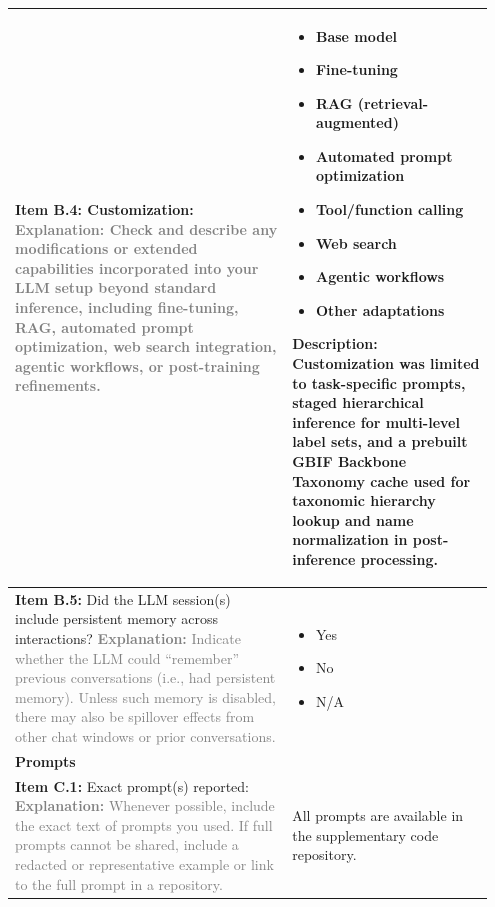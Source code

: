 \documentclass[12pt]{article}
\newcommand{\checked}{\ding{110}}
\newcommand{\unchecked}{\ding{111}}
\begin{document}
\begin{landscape}
{\begin{longtable}{|p{0.55\linewidth}|p{0.40\linewidth}|}
\textbf{Item B.4:} Customization: \textcolor{gray}{{\footnotesize \textbf{Explanation:} Check and describe any modifications or extended capabilities incorporated into your LLM setup beyond standard inference, including fine-tuning, RAG, automated prompt optimization, web search integration, agentic workflows, or post-training refinements.}} & \begin{itemize}[leftmargin=*]\setlength{\itemsep}{0pt}\setlength{\parskip}{0pt} \item[\checked] Base model \item[\unchecked] Fine-tuning \item[\unchecked] RAG (retrieval-augmented) \item[\unchecked] Automated prompt optimization \item[\unchecked] Tool/function calling \item[\unchecked] Web search \item[\unchecked] Agentic workflows \item[\unchecked] Other adaptations \end{itemize} Description: Customization was limited to task-specific prompts, staged hierarchical inference for multi-level label sets, and a prebuilt GBIF Backbone Taxonomy cache used for taxonomic hierarchy lookup and name normalization in post-inference processing. \\
\hline
\textbf{Item B.5:} Did the LLM session(s) include persistent memory across interactions? \textcolor{gray}{{\footnotesize \textbf{Explanation:} Indicate whether the LLM could ``remember'' previous conversations (i.e., had persistent memory). Unless such memory is disabled, there may also be spillover effects from other chat windows or prior conversations.}} & \begin{itemize}[leftmargin=*]\setlength{\itemsep}{0pt}\setlength{\parskip}{0pt} \item[\unchecked] Yes \item[\checked] No \item[\unchecked] N/A \end{itemize} \\
\hline
\multicolumn{2}{|l|}{\cellcolor{green!20}\textbf{Prompts}} \\
\hline
\textbf{Item C.1:} Exact prompt(s) reported: \textcolor{gray}{{\footnotesize \textbf{Explanation:} Whenever possible, include the exact text of prompts you used. If full prompts cannot be shared, include a redacted or representative example or link to the full prompt in a repository.}} & All prompts are available in the supplementary code repository. \\

\end{longtable}}
\end{landscape}
\end{document}
